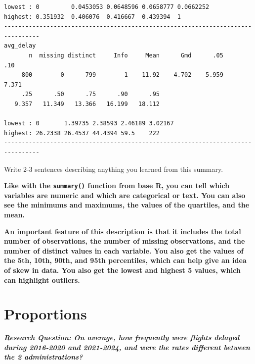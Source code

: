 \documentclass[
  letterpaper,
  DIV=11,
  numbers=noendperiod]{scrartcl}
\begin{document}
\begin{verbatim}
lowest : 0         0.0453053 0.0648596 0.0658777 0.0662252
highest: 0.351932  0.406076  0.416667  0.439394  1        
--------------------------------------------------------------------------------
avg_delay 
       n  missing distinct     Info     Mean      Gmd      .05      .10 
     800        0      799        1    11.92    4.702    5.959    7.371 
     .25      .50      .75      .90      .95 
   9.357   11.349   13.366   16.199   18.112 

lowest : 0       1.39735 2.38593 2.46189 3.02167
highest: 26.2338 26.4537 44.4394 59.5    222    
--------------------------------------------------------------------------------
\end{verbatim}

Write 2-3 sentences describing anything you learned from this summary.

\begin{tcolorbox}[enhanced jigsaw, colback=white, breakable, arc=.35mm, left=2mm, colframe=quarto-callout-warning-color-frame, opacityback=0, rightrule=.15mm, toprule=.15mm, bottomrule=.15mm, leftrule=.75mm]

\textbf{Like with the \texttt{summary()} function from base R,}
\textbf{you can tell which variables are numeric and which are
categorical or text. You can also see the minimums and maximums, the
values of the quartiles, and the mean.}

\textbf{An important feature of this description is that it includes the
total number of observations, the number of missing observations, and
the number of distinct values in each variable. You also get the values
of the 5th, 10th, 90th, and 95th percentiles, which can help give an
idea of skew in data. You also get the lowest and highest 5 values,
which can highlight outliers.}

\end{tcolorbox}

\section{Proportions}\label{proportions}

\textbf{\emph{Research Question: On average, how frequently were flights
delayed during 2016-2020 and 2021-2024, and were the rates different
between the 2 administrations?}}
\end{document}
